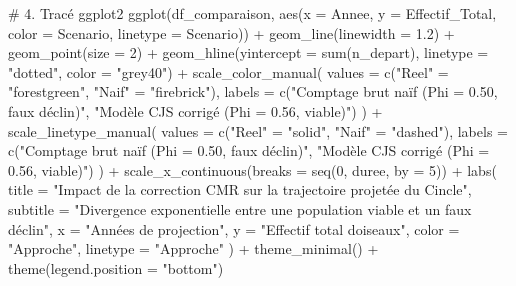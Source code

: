 \documentclass[
  french,
  a4paper,
  DIV=11,
  numbers=noendperiod,
  oneside]{scrreprt}
\newenvironment{Shaded}{}{}
\newcommand{\AttributeTok}[1]{\textcolor[rgb]{0.84,0.23,0.29}{#1}}
\newcommand{\CommentTok}[1]{\textcolor[rgb]{0.42,0.45,0.49}{#1}}
\newcommand{\DecValTok}[1]{\textcolor[rgb]{0.00,0.36,0.77}{#1}}
\newcommand{\FloatTok}[1]{\textcolor[rgb]{0.00,0.36,0.77}{#1}}
\newcommand{\FunctionTok}[1]{\textcolor[rgb]{0.44,0.26,0.76}{#1}}
\newcommand{\NormalTok}[1]{\textcolor[rgb]{0.14,0.16,0.18}{#1}}
\newcommand{\OtherTok}[1]{\textcolor[rgb]{0.44,0.26,0.76}{#1}}
\newcommand{\SpecialCharTok}[1]{\textcolor[rgb]{0.00,0.36,0.77}{#1}}
\newcommand{\StringTok}[1]{\textcolor[rgb]{0.01,0.18,0.38}{#1}}
\begin{document}
\begin{tcolorbox}
\begin{Shaded}
\begin{Highlighting}[]
\CommentTok{\# 4. Tracé ggplot2}
\FunctionTok{ggplot}\NormalTok{(df\_comparaison, }\FunctionTok{aes}\NormalTok{(}\AttributeTok{x =}\NormalTok{ Annee, }\AttributeTok{y =}\NormalTok{ Effectif\_Total, }\AttributeTok{color =}\NormalTok{ Scenario, }\AttributeTok{linetype =}\NormalTok{ Scenario)) }\SpecialCharTok{+}
  \FunctionTok{geom\_line}\NormalTok{(}\AttributeTok{linewidth =} \FloatTok{1.2}\NormalTok{) }\SpecialCharTok{+}
  \FunctionTok{geom\_point}\NormalTok{(}\AttributeTok{size =} \DecValTok{2}\NormalTok{) }\SpecialCharTok{+}
  \FunctionTok{geom\_hline}\NormalTok{(}\AttributeTok{yintercept =} \FunctionTok{sum}\NormalTok{(n\_depart), }\AttributeTok{linetype =} \StringTok{"dotted"}\NormalTok{, }\AttributeTok{color =} \StringTok{"grey40"}\NormalTok{) }\SpecialCharTok{+}
  \FunctionTok{scale\_color\_manual}\NormalTok{(}
    \AttributeTok{values =} \FunctionTok{c}\NormalTok{(}\StringTok{"Reel"} \OtherTok{=} \StringTok{"forestgreen"}\NormalTok{, }\StringTok{"Naif"} \OtherTok{=} \StringTok{"firebrick"}\NormalTok{),}
    \AttributeTok{labels =} \FunctionTok{c}\NormalTok{(}\StringTok{"Comptage brut naïf (Phi = 0.50, faux déclin)"}\NormalTok{, }\StringTok{"Modèle CJS corrigé (Phi = 0.56, viable)"}\NormalTok{)}
\NormalTok{  ) }\SpecialCharTok{+}
  \FunctionTok{scale\_linetype\_manual}\NormalTok{(}
    \AttributeTok{values =} \FunctionTok{c}\NormalTok{(}\StringTok{"Reel"} \OtherTok{=} \StringTok{"solid"}\NormalTok{, }\StringTok{"Naif"} \OtherTok{=} \StringTok{"dashed"}\NormalTok{),}
    \AttributeTok{labels =} \FunctionTok{c}\NormalTok{(}\StringTok{"Comptage brut naïf (Phi = 0.50, faux déclin)"}\NormalTok{, }\StringTok{"Modèle CJS corrigé (Phi = 0.56, viable)"}\NormalTok{)}
\NormalTok{  ) }\SpecialCharTok{+}
  \FunctionTok{scale\_x\_continuous}\NormalTok{(}\AttributeTok{breaks =} \FunctionTok{seq}\NormalTok{(}\DecValTok{0}\NormalTok{, duree, }\AttributeTok{by =} \DecValTok{5}\NormalTok{)) }\SpecialCharTok{+}
  \FunctionTok{labs}\NormalTok{(}
    \AttributeTok{title =} \StringTok{"Impact de la correction CMR sur la trajectoire projetée du Cincle"}\NormalTok{,}
    \AttributeTok{subtitle =} \StringTok{"Divergence exponentielle entre une population viable et un faux déclin"}\NormalTok{,}
    \AttributeTok{x =} \StringTok{"Années de projection"}\NormalTok{,}
    \AttributeTok{y =} \StringTok{"Effectif total d\textquotesingle{}oiseaux"}\NormalTok{,}
    \AttributeTok{color =} \StringTok{"Approche"}\NormalTok{,}
    \AttributeTok{linetype =} \StringTok{"Approche"}
\NormalTok{  ) }\SpecialCharTok{+}
  \FunctionTok{theme\_minimal}\NormalTok{() }\SpecialCharTok{+}
  \FunctionTok{theme}\NormalTok{(}\AttributeTok{legend.position =} \StringTok{"bottom"}\NormalTok{)}
\end{Highlighting}
\end{Shaded}


\end{tcolorbox}
\end{document}
